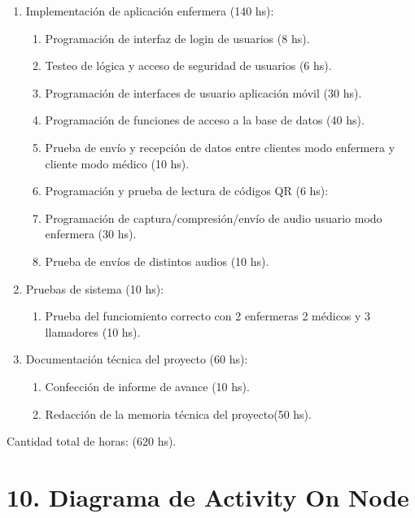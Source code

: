 \documentclass[
11pt, %
]{charter}
\begin{document}
\begin{enumerate}
\item Implementación de aplicación enfermera (140 hs):
	\begin{enumerate}
	\item Programación de interfaz de login de usuarios (8 hs).
	\item Testeo de lógica y acceso de seguridad de usuarios (6 hs).
	\item Programación de interfaces de usuario aplicación móvil (30 hs).
	\item Programación de funciones de acceso a la base de datos (40 hs).
	\item Prueba de envío y recepción de datos entre clientes modo enfermera y cliente modo médico (10 hs).
	\item Programación y prueba de lectura de códigos QR (6 hs):
	\item Programación de captura/compresión/envío de audio usuario modo enfermera (30 hs).
	\item Prueba de envíos de distintos audios (10 hs).
	\end{enumerate}
	
\item Pruebas de sistema (10 hs):
	\begin{enumerate}	
	\item Prueba del funciomiento correcto con 2 enfermeras 2 médicos y 3 llamadores (10 hs).
	\end{enumerate}	

\item Documentación técnica del proyecto (60 hs):
	\begin{enumerate}	
	\item Confección de informe de avance (10 hs).
	\item Redacción de la memoria técnica del proyecto(50 hs).
	\end{enumerate}	
		
\end{enumerate}

Cantidad total de horas: (620 hs).
\newpage

\section{10. Diagrama de Activity On Node}
\label{sec:AoN}


\end{document}
